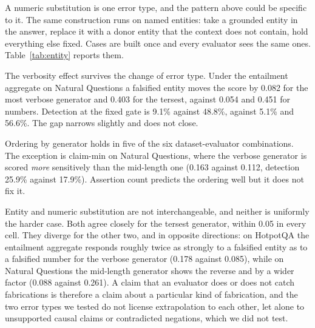 \documentclass[11pt]{article}
\begin{document}
A numeric substitution is one error type, and the pattern above could be specific to it. The same construction runs on named entities: take a grounded entity in the answer, replace it with a donor entity that the context does not contain, hold everything else fixed. Cases are built once and every evaluator sees the same ones. Table~\ref{tab:entity} reports them.

The verbosity effect survives the change of error type. Under the entailment aggregate on Natural Questions a falsified entity moves the score by 0.082 for the most verbose generator and 0.403 for the tersest, against 0.054 and 0.451 for numbers. Detection at the fixed gate is 9.1\% against 48.8\%, against 5.1\% and 56.6\%. The gap narrows slightly and does not close.

Ordering by generator holds in five of the six dataset-evaluator combinations. The exception is claim-min on Natural Questions, where the verbose generator is scored \emph{more} sensitively than the mid-length one (0.163 against 0.112, detection 25.9\% against 17.9\%). Assertion count predicts the ordering well but it does not fix it.

Entity and numeric substitution are not interchangeable, and neither is uniformly the harder case. Both agree closely for the tersest generator, within 0.05 in every cell. They diverge for the other two, and in opposite directions: on HotpotQA the entailment aggregate responds roughly twice as strongly to a falsified entity as to a falsified number for the verbose generator (0.178 against 0.085), while on Natural Questions the mid-length generator shows the reverse and by a wider factor (0.088 against 0.261). A claim that an evaluator does or does not catch fabrications is therefore a claim about a particular kind of fabrication, and the two error types we tested do not license extrapolation to each other, let alone to unsupported causal claims or contradicted negations, which we did not test.
\end{document}

